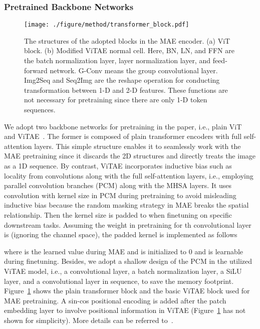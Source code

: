 \documentclass[10pt, journal,twoside]{IEEEtran}
\begin{document}
 
\subsubsection{Pretrained Backbone Networks}

 \begin{figure}[t]
  \centering
  \texttt{[image: ./figure/method/transformer\_block.pdf]}\\
  \caption{The structures of the adopted blocks in the MAE encoder. (a) ViT block. (b) Modified ViTAE normal cell. Here, BN, LN, and FFN are the batch normalization layer, layer normalization layer, and feed-forward network. G-Conv means the group convolutional layer. Img2Seq and Seq2Img are the reshape operation for conducting transformation between 1-D and 2-D features. These functions are not necessary for pretraining since there are only 1-D token sequences.
  }
  \label{transformer_block}
\end{figure}


We adopt two backbone networks for pretraining in the paper, i.e., plain ViT~\cite{vit} and ViTAE~\cite{xu2021vitae}. The former is composed of plain transformer encoders with full self-attention layers. This simple structure enables it to seamlessly work with the MAE pretraining since it discards the 2D structures and directly treats the image as a 1D sequence. By contrast, ViTAE incorporates inductive bias such as locality from convolutions along with the full self-attention layers, i.e., employing parallel convolution branches (PCM) along with the MHSA layers. It uses convolution with kernel size  in PCM during pretraining to avoid misleading inductive bias because the random masking strategy in MAE breaks the spatial relationship. Then the kernel size is padded to  when finetuning on specific downstream tasks. Assuming the weight in pretraining for th convolutional layer is  (ignoring the channel space), the padded kernel is implemented as follows 

 
where  is the learned value during MAE and  is initialized to 0 and is learnable during finetuning. Besides, we adopt a shallow design of the PCM in the utilized ViTAE model, i.e., a convolutional layer, a batch normalization layer, a SiLU layer\cite{silu}, and a convolutional layer in sequence, to save the memory footprint. Figure~\ref{transformer_block} shows the plain transformer block and the basic ViTAE block used for MAE pretraining. A sin-cos positional encoding is added after the patch embedding layer to involve positional information in ViTAE (Figure~\ref{transformer_block} has not shown for simplicity). More details can be referred to~\cite{xu2021vitae, vitae_v2}.
\end{document}
